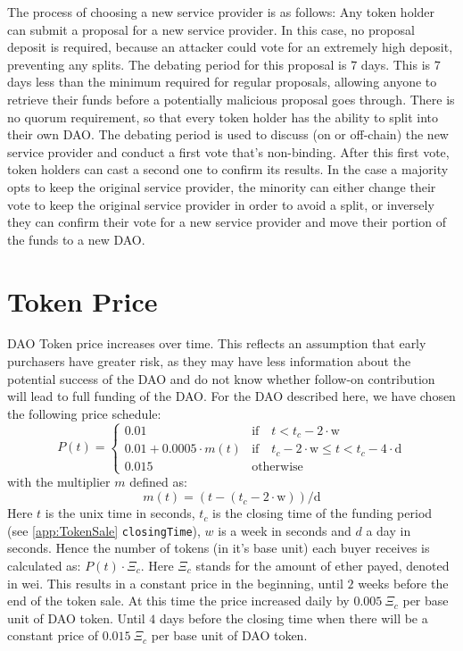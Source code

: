 \documentclass[9pt,oneside]{amsart}
\begin{document}
\begin{multicols}{2}
The process of choosing a new service provider is as follows:
Any token holder can submit a proposal for a new service provider. In this case, no proposal deposit is required, because an attacker could vote for an extremely high deposit, preventing any splits. The debating period for this proposal is $7$ days.
This is $7$ days less than the minimum required for regular proposals, allowing anyone to retrieve their funds before a potentially malicious proposal goes through. There is no quorum requirement, so that every token holder has the ability to split into their own DAO. 
The debating period is used to discuss (on or off-chain) the new service provider and conduct a first vote that's non-binding. After this first vote, token holders can cast a second one to confirm its results. In the case a majority opts to  keep the original service provider, the minority can either change their vote to keep the original service provider in order to avoid a split, or inversely they can confirm their vote for a new service provider and move their portion of the funds to a new DAO.

\section{Token Price} \label{TokenPrice}
DAO Token price increases over time. This reflects an assumption that early purchasers have greater risk, as they may have less information about the potential success of the DAO and do not know whether follow-on contribution will lead to full funding of the DAO. 
For the DAO described here, we have chosen the following price schedule:
\begin{equation}
 P(t) = \begin{cases}
0.01 & \text{if} \quad t < t_c - 2 \cdot \text{w} \\
0.01 + 0.0005 \cdot m(t) & \text{if} \quad t_c - 2 \cdot \text{w} \leqslant t < t_c - 4 \cdot \text{d} \\
0.015 & \text{otherwise}
\end{cases}
\end{equation}
with the multiplier $m$ defined as:
\begin{equation}
 m(t) = (t - (t_c - 2 \cdot \text{w})) / \text{d}
\end{equation}
Here $t$ is the unix time in seconds, $t_c$ is the closing time of the funding period (see \ref{app:TokenSale} \verb|closingTime|), $w$ is a week in seconds and $d$ a day in seconds.
Hence the number of tokens (in it’s base unit) each buyer receives is calculated as: $P(t) \cdot \Xi_c$. Here $\Xi_c$ stands for the amount of ether payed, denoted in wei.
This results in a constant price in the beginning, until $2$ weeks before the end of the token sale. At this time the price increased daily by $0.005 \: \Xi_c$ per base unit of DAO token. Until $4$ days before the closing time when there will be a constant price of $0.015 \: \Xi_c$ per base unit of DAO token.


\end{multicols}
\end{document}
